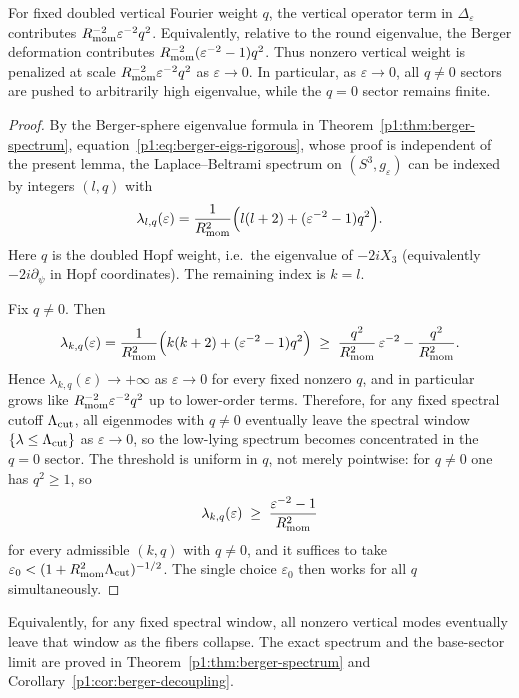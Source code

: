 \documentclass[11pt]{article}
\begin{document}
\begin{lemma}
\label{p1:lem:hopf-penalty}
For fixed doubled vertical Fourier weight \(q\), the vertical operator term in \(\Delta_\varepsilon\) contributes \(R_{\mathrm{mom}}^{-2}\varepsilon^{-2}q^2\). Equivalently, relative to the round eigenvalue, the Berger deformation contributes \(R_{\mathrm{mom}}^{-2}(\varepsilon^{-2}-1)q^2\). Thus nonzero vertical weight is penalized at scale \(R_{\mathrm{mom}}^{-2}\varepsilon^{-2}q^2\) as \(\varepsilon\to0\).
In particular, as $\varepsilon\to0$, all $q\neq0$ sectors are pushed to arbitrarily high eigenvalue,
while the $q=0$ sector remains finite. \cite{berger1960spectre,besse1978manifolds}
\end{lemma}
\begin{proof}
By the Berger-sphere eigenvalue formula in
Theorem~\ref{p1:thm:berger-spectrum}, equation~\eqref{p1:eq:berger-eigs-rigorous},
whose proof is independent of the present lemma,
the Laplace--Beltrami spectrum on $(S^3,g_\varepsilon)$ can be indexed by integers $(l,q)$ with
\[
\lambda_{l,q}(\varepsilon)=\frac{1}{R_{\mathrm{mom}}^2}\Bigl(l(l+2)+(\varepsilon^{-2}-1)q^2\Bigr).
\]
Here \(q\) is the doubled Hopf weight, i.e.\ the eigenvalue of \(-2iX_3\) (equivalently \(-2i\partial_\psi\) in Hopf coordinates). The remaining index is \(k=l\).

Fix $q\neq 0$. Then
\[
\lambda_{k,q}(\varepsilon)
=\frac{1}{R_{\mathrm{mom}}^2}\Bigl(k(k+2)+(\varepsilon^{-2}-1)q^2\Bigr)
\;\ge\;\frac{q^2}{R_{\mathrm{mom}}^2}\,\varepsilon^{-2}-\frac{q^2}{R_{\mathrm{mom}}^2}.
\]
Hence $\lambda_{k,q}(\varepsilon)\to+\infty$ as $\varepsilon\to 0$ for every fixed nonzero $q$,
and in particular grows like \(R_{\mathrm{mom}}^{-2}\varepsilon^{-2}q^2\) up to lower-order terms. Therefore, for any fixed spectral cutoff
\(\Lambda_{\mathrm{cut}}\), all eigenmodes with \(q\neq 0\) eventually leave the spectral window \(\{\lambda\le \Lambda_{\mathrm{cut}}\}\) as
\(\varepsilon\to 0\), so the low-lying spectrum becomes concentrated in the \(q=0\) sector.
The threshold is uniform in \(q\), not merely pointwise: for \(q\neq0\) one has
\(q^2\ge1\), so
\[
  \lambda_{k,q}(\varepsilon)\;\ge\;\frac{\varepsilon^{-2}-1}{R_{\mathrm{mom}}^2}
\]
for every admissible \((k,q)\) with \(q\neq0\), and it suffices to take
\(\varepsilon_0<(1+R_{\mathrm{mom}}^2\Lambda_{\mathrm{cut}})^{-1/2}\).  The single choice
\(\varepsilon_0\) then works for all \(q\) simultaneously.
\end{proof}

Equivalently, for any fixed spectral window, all nonzero vertical modes
eventually leave that window as the fibers collapse.  The exact spectrum and the
base-sector limit are proved in
Theorem~\ref{p1:thm:berger-spectrum} and
Corollary~\ref{p1:cor:berger-decoupling}.
\end{document}
